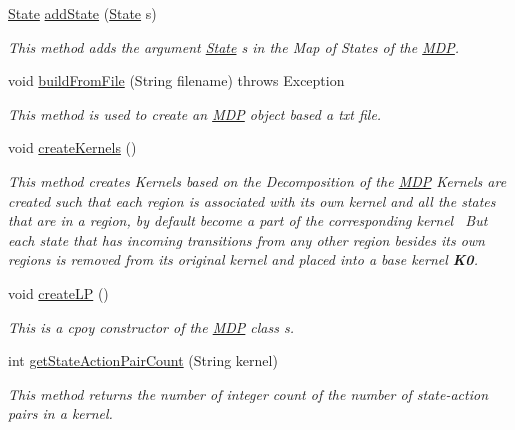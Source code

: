 \begin{DoxyCompactItemize}
\hyperlink{classmdp_1_1core_1_1_state}{State} \hyperlink{classmdp_1_1core_1_1_m_d_p_a0956e730497b8c93b09675990a75f283}{add\+State} (\hyperlink{classmdp_1_1core_1_1_state}{State} s)
\begin{DoxyCompactList}\small\item\em This method adds the argument \hyperlink{classmdp_1_1core_1_1_state}{State} s in the Map of States of the \hyperlink{classmdp_1_1core_1_1_m_d_p}{M\+D\+P}. \end{DoxyCompactList}\item 
void \hyperlink{classmdp_1_1core_1_1_m_d_p_a0565cd0a84c836dd11ba0d13e1eb5ffb}{build\+From\+File} (String filename)  throws Exception 	
\begin{DoxyCompactList}\small\item\em This method is used to create an \hyperlink{classmdp_1_1core_1_1_m_d_p}{M\+D\+P} object based a txt file. \end{DoxyCompactList}\item 
void \hyperlink{classmdp_1_1core_1_1_m_d_p_aa3d7c9f10aff03c993322d3ff7129dfb}{create\+Kernels} ()
\begin{DoxyCompactList}\small\item\em This method creates Kernels based on the Decomposition of the \hyperlink{classmdp_1_1core_1_1_m_d_p}{M\+D\+P} Kernels are created such that each region is associated with its own kernel and all the states that are in a region, by default become a part of the corresponding kernel~\newline
 But each state that has incoming transitions from any other region besides its own regions is removed from its original kernel and placed into a base kernel {\bfseries K0}.~\newline
 \end{DoxyCompactList}\item 
void \hyperlink{classmdp_1_1core_1_1_m_d_p_ab2c6f9846cf9362a472f66e1c7fe4117}{create\+L\+P} ()
\begin{DoxyCompactList}\small\item\em This is a cpoy constructor of the \hyperlink{classmdp_1_1core_1_1_m_d_p}{M\+D\+P} class s. \end{DoxyCompactList}\item 
int \hyperlink{classmdp_1_1core_1_1_m_d_p_a597956fa2391fdd8ff1a3266d5e48688}{get\+State\+Action\+Pair\+Count} (String kernel)
\begin{DoxyCompactList}\small\item\em This method returns the number of integer count of the number of state-\/action pairs in a kernel. \end{DoxyCompactList}\item 

\end{DoxyCompactItemize}
